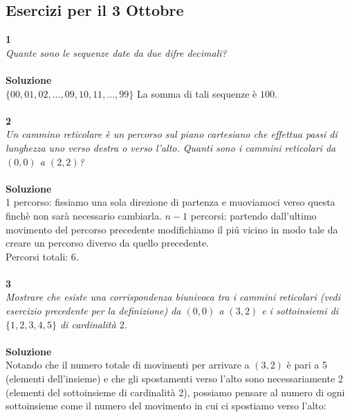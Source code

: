 \documentclass[11pt]{article}
\begin{document}
            \subsection{Esercizi per il 3 Ottobre}
			\textbf{\large 1} \\
			\textit{Quante sono le sequenze date da due difre decimali?} \\\\
			\textbf{Soluzione} \\
			$\{00,01,02,...,09,10,11,...,99\}$ La somma di tali sequenze \`e $100$. \\\\
			\textbf{\large 2} \\
			\textit{Un cammino reticolare è un percorso sul piano cartesiano che 			effettua passi di lunghezza uno verso destra o verso l’alto. Quanti 				sono i cammini reticolari da $(0,0)$ a $(2,2)$?} \\\\
			\textbf{Soluzione} \\
			1 percorso: fissiamo una sola direzione di partenza e muoviamoci verso questa finch\`e non sar\`a necessario cambiarla.
			$n-1$ percorsi: partendo dall'ultimo movimento del percorso precedente modifichiamo il pi\'u vicino in modo tale da creare un percorso diverso da quello precedente. \\ 
			Percorsi totali: $6$. \\\\			
			\textbf{\large 3} \\
			\textit{Mostrare che esiste una corrispondenza biunivoca tra i cammini reticolari (vedi esercizio precedente per la definizione) da $(0,0)$ a $(3,2)$ e i sottoinsiemi di $\{1,2,3,4,5\}$ di cardinalit\`a $2$.}	\\\\
			\textbf{Soluzione} \\
			Notando che il numero totale di movimenti per arrivare a $(3,2)$ è pari a 5 (elementi dell'insieme) e che gli spostamenti verso l'alto sono necessariamente 2 (elementi del sottoinsieme di cardinalit\`a 2), possiamo pensare al numero di ogni sottoinsieme come il numero del movimento in cui ci spostiamo verso l'alto:\\
			
\end{document}
